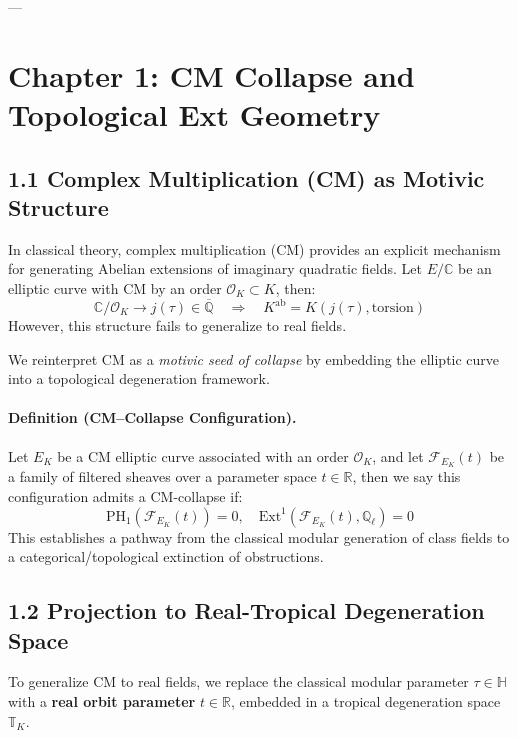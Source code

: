 \documentclass[11pt]{article}
\begin{document}
---


\section*{Chapter 1: CM Collapse and Topological Ext Geometry}

\subsection*{1.1 Complex Multiplication (CM) as Motivic Structure}

In classical theory, complex multiplication (CM) provides an explicit mechanism for generating Abelian extensions of imaginary quadratic fields. Let \( E/\mathbb{C} \) be an elliptic curve with CM by an order \( \mathcal{O}_K \subset K \), then:
\[
\mathbb{C}/\mathcal{O}_K \longrightarrow j(\tau) \in \overline{\mathbb{Q}} \quad \Rightarrow \quad K^{\mathrm{ab}} = K(j(\tau), \text{torsion})
\]
However, this structure fails to generalize to real fields.

We reinterpret CM as a \emph{motivic seed of collapse} by embedding the elliptic curve into a topological degeneration framework.

\paragraph{Definition (CM–Collapse Configuration).}
Let \( E_K \) be a CM elliptic curve associated with an order \( \mathcal{O}_K \), and let \( \mathcal{F}_{E_K}(t) \) be a family of filtered sheaves over a parameter space \( t \in \mathbb{R} \), then we say this configuration admits a CM-collapse if:
\[
\mathrm{PH}_1(\mathcal{F}_{E_K}(t)) = 0, \quad \mathrm{Ext}^1(\mathcal{F}_{E_K}(t), \mathbb{Q}_\ell) = 0
\]
This establishes a pathway from the classical modular generation of class fields to a categorical/topological extinction of obstructions.

\subsection*{1.2 Projection to Real-Tropical Degeneration Space}

To generalize CM to real fields, we replace the classical modular parameter \( \tau \in \mathbb{H} \) with a \textbf{real orbit parameter} \( t \in \mathbb{R} \), embedded in a tropical degeneration space \( \mathbb{T}_K \).
\end{document}
